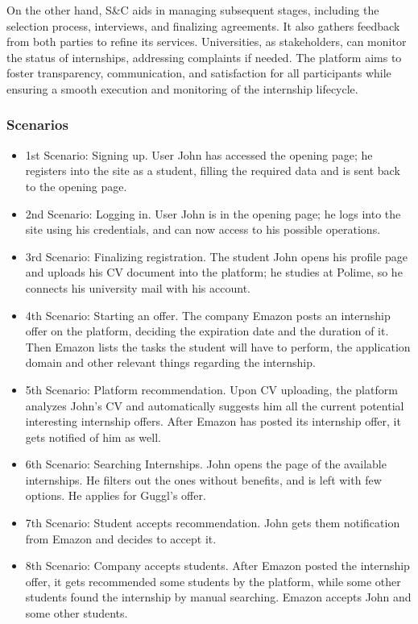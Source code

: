 \documentclass{article}
\begin{document}
On the other hand, S\&C aids in managing subsequent stages, including the selection process, interviews, and finalizing agreements. It also gathers feedback from both parties to refine its services. 
Universities, as stakeholders, can monitor the status of internships, addressing complaints if needed. The platform aims to foster transparency, communication, and satisfaction for all participants while ensuring a smooth execution and monitoring of the internship lifecycle.
\subsubsection{Scenarios}
    \begin{itemize}
        \item 1st Scenario: Signing up. User John has accessed the opening page; he registers into the site as a student, filling the required data and is sent back to the opening page.
        \item 2nd Scenario: Logging in. User John is in the opening page; he logs into the site using his credentials, and can now access to his possible operations.
        \item 3rd Scenario: Finalizing registration. The student John opens his profile page and uploads his CV document into the platform; he studies at Polime, so he connects his university mail with his account.
        \item 4th Scenario: Starting an offer. The company Emazon posts an internship offer on the platform, deciding the expiration date and the duration of it. Then Emazon lists the tasks the student will have to perform, the application domain and other relevant things regarding the internship.  
        \item 5th Scenario: Platform recommendation. Upon CV uploading, the platform analyzes John's CV and automatically suggests him all the current potential interesting internship offers. After Emazon has posted its internship offer, it gets notified of him as well.
        \item 6th Scenario: Searching Internships. John opens the page of the available internships. He filters out the ones without benefits, and is left with few options. He applies for Guggl's offer.
        \item 7th Scenario: Student accepts recommendation. John gets them notification from Emazon and decides to accept it.
        \item 8th Scenario: Company accepts students. After Emazon posted the internship offer, it gets recommended some students by the platform, while some other students found the internship by manual searching. Emazon accepts John and some other students.

\end{itemize}
\end{document}
